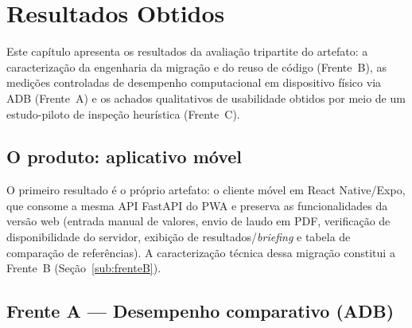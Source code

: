 %

\section{Resultados Obtidos}
\label{sec:resultados}

Este capítulo apresenta os resultados da avaliação tripartite do artefato: a
caracterização da engenharia da migração e do reuso de código (Frente~B), as
medições controladas de desempenho computacional em dispositivo físico via ADB
(Frente~A) e os achados qualitativos de usabilidade obtidos por meio de um
estudo-piloto de inspeção heurística (Frente~C).

\subsection{O produto: aplicativo móvel}
\label{sub:produto}

O primeiro resultado é o próprio artefato: o cliente móvel em React Native/Expo,
que consome a mesma API FastAPI do PWA e preserva as funcionalidades da versão
web (entrada manual de valores, envio de laudo em PDF, verificação de
disponibilidade do servidor, exibição de resultados/\emph{briefing} e tabela de
comparação de referências). A caracterização técnica dessa migração constitui a
Frente~B (Seção~\ref{sub:frenteB}).

\subsection{Frente A --- Desempenho comparativo (ADB)}
\label{sub:frenteA}

